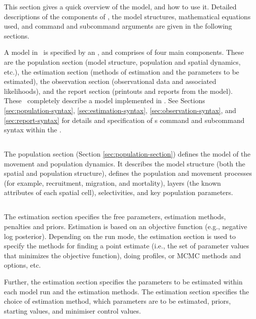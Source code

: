 This section gives a quick overview of the model, and how to use it. Detailed descriptions of the components of \SPM, the model structures, mathematical equations used, and command and subcommand arguments are given in the following sections.

A model in \SPM\ is specified by an \config, and comprises of four main components. These are the population section (model structure, population and spatial dynamics, etc.), the estimation section (methods of estimation and the parameters to be estimated), the observation section (observational data and associated likelihoods), and the report section (printouts and reports from the model). These \config\ completely describe a model implemented in \SPM. See Sections \ref{sec:population-syntax}, \ref{sec:estimation-syntax}, \ref{sec:observation-syntax}, and \ref{sec:report-syntax} for details and specification of \SPM s command and subcommand syntax within the \config. 

\subsection{}

The population section (Section \ref{sec:population-section}) defines the model of the movement and population dynamics. It describes the model structure (both the spatial and population structure), defines the population and movement processes (for example, recruitment, migration, and mortality), layers (the known attributes of each spatial cell), selectivities, and key population parameters.

\subsection{}

The estimation section specifies the free parameters, estimation methods, penalties and priors. Estimation is based on an objective function (e.g., negative log posterior). Depending on the run mode, the estimation section is used to specify the methods for finding a point estimate (i.e., the set of parameter values that minimizes the objective function), doing profiles, or MCMC methods and options, etc.

Further, the estimation section specifies the parameters to be estimated within each model run and the estimation methods. The estimation section specifies the choice of estimation method, which parameters are to be estimated, priors, starting values, and minimiser control values.

